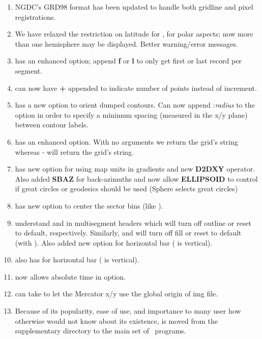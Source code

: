 \begin{enumerate}
\item NGDC's GRD98 format has been updated to handle both gridline and pixel registrations.
\item We have relaxed the restriction on latitude for ,  for polar aspects; now more
than one hemisphere may be displayed.  Better warning/error messages.
\item {} has an enhanced  option; append {\bf f} or {\bf l}  to only get first or last record per segment.
\item {}  can now have {\bf +} appended to indicate number of points instead of increment.
\item {} has a new option  to orient dumped contours.
Can now append :{\it radius} to the  option in order to specify a minimum
spacing (measured in the x/y plane) between contour labels.
\item {} has an enhanced  option.  With no arguments we return the grid's  string
whereas - will return the grid's  string.
\item {} has new option  for using map units in gradients and new {\bf D2DXY} operator.
Also added {\bf SBAZ} for back-azimuths and now allow {\bf ELLIPSOID} to control if great
circles or geodesics should be used (Sphere selects great circles)
\item {} has new  option to center the sector bins (like  ).
\item {} understand  and  in multisegment headers which will turn off outline or reset to default, respectively.
Similarly,  and  will turn off fill or reset to default (with ).
Also added new option  for horizontal bar ( is vertical).
\item {} also has  for horizontal bar ( is vertical).
\item {} now allows absolute time in  option.
\item {} can take  to let the Mercator x/y use the global origin of img file.
\item Because of its popularity, ease of use, and importance to many user how otherwise would not know about its
existence,  is moved from the supplementary  directory to the main set of \GMT\
programs.
\end{enumerate}

